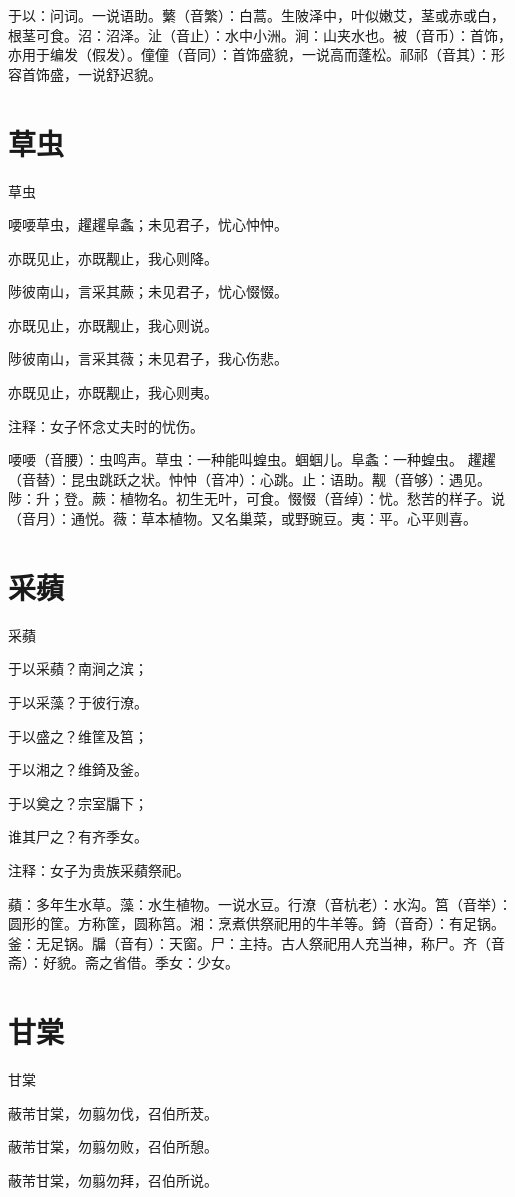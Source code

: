 \documentclass[12pt,UTF8]{ctexbook}
\begin{document}
于以：问词。一说语助。蘩（音繁）：白蒿。生陂泽中，叶似嫩艾，茎或赤或白，根茎可食。沼：沼泽。沚（音止）：水中小洲。涧：山夹水也。被（音币）：首饰，亦用于编发（假发）。僮僮（音同）：首饰盛貌，一说高而蓬松。祁祁（音其）：形容首饰盛，一说舒迟貌。
\chapter{草虫}
草虫

喓喓草虫，趯趯阜螽；未见君子，忧心忡忡。

亦既见止，亦既觏止，我心则降。

陟彼南山，言采其蕨；未见君子，忧心惙惙。

亦既见止，亦既觏止，我心则说。

陟彼南山，言采其薇；未见君子，我心伤悲。

亦既见止，亦既觏止，我心则夷。

注释：女子怀念丈夫时的忧伤。

喓喓（音腰）：虫鸣声。草虫：一种能叫蝗虫。蝈蝈儿。阜螽：一种蝗虫。 趯趯（音替）：昆虫跳跃之状。忡忡（音冲）：心跳。止：语助。觏（音够）：遇见。陟：升；登。蕨：植物名。初生无叶，可食。惙惙（音绰）：忧。愁苦的样子。说（音月）：通悦。薇：草本植物。又名巢菜，或野豌豆。夷：平。心平则喜。
\chapter{采蘋}
采蘋

于以采蘋？南涧之滨；

于以采藻？于彼行潦。

于以盛之？维筐及筥；

于以湘之？维錡及釜。

于以奠之？宗室牖下；

谁其尸之？有齐季女。

注释：女子为贵族采蘋祭祀。

蘋：多年生水草。藻：水生植物。一说水豆。行潦（音杭老）：水沟。筥（音举）：圆形的筐。方称筐，圆称筥。湘：烹煮供祭祀用的牛羊等。錡（音奇）：有足锅。釜：无足锅。牖（音有）：天窗。尸：主持。古人祭祀用人充当神，称尸。齐（音斋）：好貌。斋之省借。季女：少女。
\chapter{甘棠}
甘棠

蔽芾甘棠，勿翦勿伐，召伯所茇。

蔽芾甘棠，勿翦勿败，召伯所憩。

蔽芾甘棠，勿翦勿拜，召伯所说。
\end{document}
